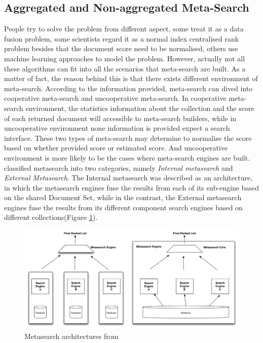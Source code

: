 \subsection{Aggregated and Non-aggregated Meta-Search} 

People try to solve the problem from different aspect, some treat it as a data fusion problem, some scientists regard it as a normal index centralised rank problem besides that the document score need to be normalised, others use machine learning approaches to model the problem. However, actually not all these algorithms can fit into all the scenarios that meta-search are built. As a matter of fact, the reason behind this is that there exists different environment of meta-search. According to the information provided, meta-search can dived into cooperative meta-search and uncooperative meta-search\cite{Shokouhi 2011}.  In cooperative meta-search environment, the statistics information about the collection and the score of each returned document will accessible to meta-search builders, while in uncooperative environment none information is provided expect a search interface. These two types of meta-search may determine to normalise the score based on  whether provided score or  estimated score. And uncooperative environment is more likely to be the cases where meta-search engines are built.
\cite{Montague2002} classified metasearch into two categories, namely \textit{Internal metasearch} and \textit{External Metasearch}. The Internal metasearch was described as an architecture, in which the metasearch engines fuse the results from each of its sub-engine based on the shared Document Set, while in the contrast, the External metasearch engines fuse the results from its different component search engines based on different collections(Figure \ref{fig:agg}). 
\begin{figure} 
	\includegraphics[width=12cm]{CMS.jpg}
	 \caption{Metasearch architectures from \cite{Montague2002}\label{fig:agg}} 
	 \end{figure}
